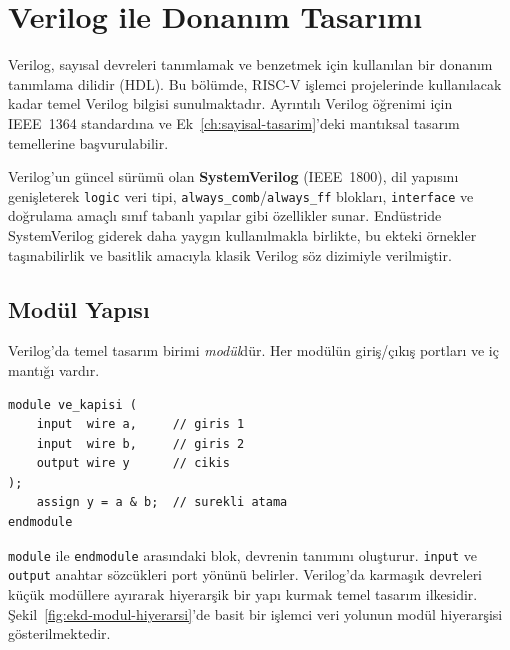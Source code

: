 \section{Verilog ile Donanım Tasarımı}
\label{sec:ekd-verilog}

Verilog, sayısal devreleri tanımlamak ve benzetmek için kullanılan bir donanım tanımlama dilidir (HDL). Bu bölümde, RISC-V işlemci projelerinde kullanılacak kadar temel Verilog bilgisi sunulmaktadır. Ayrıntılı Verilog öğrenimi için IEEE~1364 standardına ve Ek~\ref{ch:sayisal-tasarim}'deki mantıksal tasarım temellerine başvurulabilir.

Verilog'un güncel sürümü olan \textbf{SystemVerilog} (IEEE~1800), dil yapısını genişleterek \texttt{logic} veri tipi, \texttt{always\_comb}/\texttt{always\_ff} blokları, \texttt{interface} ve doğrulama amaçlı sınıf tabanlı yapılar gibi özellikler sunar. Endüstride SystemVerilog giderek daha yaygın kullanılmakla birlikte, bu ekteki örnekler taşınabilirlik ve basitlik amacıyla klasik Verilog söz dizimiyle verilmiştir.

\subsection{Modül Yapısı}
\label{sec:ekd-modul}

Verilog'da temel tasarım birimi \emph{modül}dür. Her modülün giriş/çıkış portları ve iç mantığı vardır.

\begin{lstlisting}[style=verilog, caption={Verilog modül yapısı: 2 girişli VE kapısı}, label={lst:ekd-ve-kapisi}]
module ve_kapisi (
    input  wire a,     // giris 1
    input  wire b,     // giris 2
    output wire y      // cikis
);
    assign y = a & b;  // surekli atama
endmodule
\end{lstlisting}

\texttt{module} ile \texttt{endmodule} arasındaki blok, devrenin tanımını oluşturur. \texttt{input} ve \texttt{output} anahtar sözcükleri port yönünü belirler. Verilog'da karmaşık devreleri küçük modüllere ayırarak hiyerarşik bir yapı kurmak temel tasarım ilkesidir. Şekil~\ref{fig:ekd-modul-hiyerarsi}'de basit bir işlemci veri yolunun modül hiyerarşisi gösterilmektedir.

